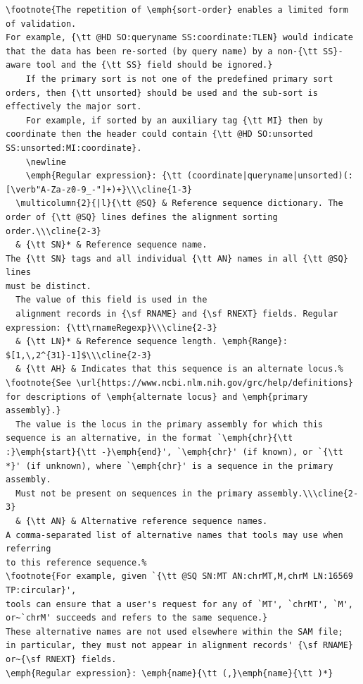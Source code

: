 \begin{verbatim}
\footnote{The repetition of \emph{sort-order} enables a limited form of validation.
For example, {\tt @HD SO:queryname SS:coordinate:TLEN} would indicate that the data has been re-sorted (by query name) by a non-{\tt SS}-aware tool and the {\tt SS} field should be ignored.}
    If the primary sort is not one of the predefined primary sort orders, then {\tt unsorted} should be used and the sub-sort is effectively the major sort.
    For example, if sorted by an auxiliary tag {\tt MI} then by coordinate then the header could contain {\tt @HD SO:unsorted SS:unsorted:MI:coordinate}.
    \newline
    \emph{Regular expression}: {\tt (coordinate|queryname|unsorted)(:[\verb"A-Za-z0-9_-"]+)+}\\\cline{1-3}
  \multicolumn{2}{|l}{\tt @SQ} & Reference sequence dictionary. The order of {\tt @SQ} lines defines the alignment sorting order.\\\cline{2-3}
  & {\tt SN}* & Reference sequence name.
The {\tt SN} tags and all individual {\tt AN} names in all {\tt @SQ} lines
must be distinct.
  The value of this field is used in the
  alignment records in {\sf RNAME} and {\sf RNEXT} fields. Regular expression: {\tt\rnameRegexp}\\\cline{2-3}
  & {\tt LN}* & Reference sequence length. \emph{Range}: $[1,\,2^{31}-1]$\\\cline{2-3}
  & {\tt AH} & Indicates that this sequence is an alternate locus.%
\footnote{See \url{https://www.ncbi.nlm.nih.gov/grc/help/definitions} for descriptions of \emph{alternate locus} and \emph{primary assembly}.}
  The value is the locus in the primary assembly for which this sequence is an alternative, in the format `\emph{chr}{\tt :}\emph{start}{\tt -}\emph{end}', `\emph{chr}' (if known), or `{\tt *}' (if unknown), where `\emph{chr}' is a sequence in the primary assembly.
  Must not be present on sequences in the primary assembly.\\\cline{2-3}
  & {\tt AN} & Alternative reference sequence names.
A comma-separated list of alternative names that tools may use when referring
to this reference sequence.%
\footnote{For example, given `{\tt @SQ SN:MT AN:chrMT,M,chrM LN:16569 TP:circular}',
tools can ensure that a user's request for any of `MT', `chrMT', `M',
or~`chrM' succeeds and refers to the same sequence.}
These alternative names are not used elsewhere within the SAM file;
in particular, they must not appear in alignment records' {\sf RNAME}
or~{\sf RNEXT} fields.
\emph{Regular expression}: \emph{name}{\tt (,}\emph{name}{\tt )*}

\end{verbatim}
